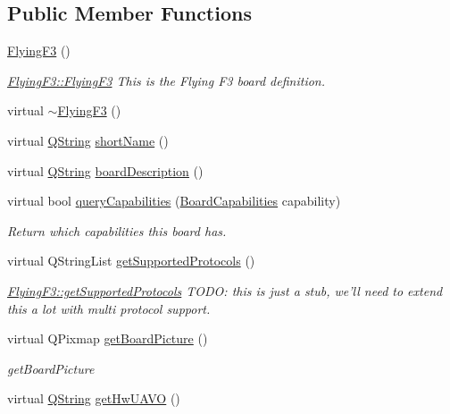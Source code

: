 \subsection*{Public Member Functions}
\begin{DoxyCompactItemize}
\item 
\hyperlink{group___boards___stm_ga9b44241cce2e1f0737c9fef2eace273b}{Flying\-F3} ()
\begin{DoxyCompactList}\small\item\em \hyperlink{group___boards___stm_ga9b44241cce2e1f0737c9fef2eace273b}{Flying\-F3\-::\-Flying\-F3} This is the Flying F3 board definition. \end{DoxyCompactList}\item 
virtual \hyperlink{group___boards___stm_ga23437724f5332cc76950a41249c6d968}{$\sim$\-Flying\-F3} ()
\item 
virtual \hyperlink{group___u_a_v_objects_plugin_gab9d252f49c333c94a72f97ce3105a32d}{Q\-String} \hyperlink{group___boards___stm_ga968d0cdefdfe42c8f2dfbc4cafca72f2}{short\-Name} ()
\item 
virtual \hyperlink{group___u_a_v_objects_plugin_gab9d252f49c333c94a72f97ce3105a32d}{Q\-String} \hyperlink{group___boards___stm_ga76b7c5c83fb46e122a100ae0ef5fae8f}{board\-Description} ()
\item 
virtual bool \hyperlink{group___boards___stm_ga92cb3b23d790b1b3aadab14c830412f3}{query\-Capabilities} (\hyperlink{group___core_plugin_ga01b09218f2a13aaeee6db007ac6bd967}{Board\-Capabilities} capability)
\begin{DoxyCompactList}\small\item\em Return which capabilities this board has. \end{DoxyCompactList}\item 
virtual Q\-String\-List \hyperlink{group___boards___stm_ga96db192be19ed6a7af49c8668cf4ff36}{get\-Supported\-Protocols} ()
\begin{DoxyCompactList}\small\item\em \hyperlink{group___boards___stm_ga96db192be19ed6a7af49c8668cf4ff36}{Flying\-F3\-::get\-Supported\-Protocols} T\-O\-D\-O\-: this is just a stub, we'll need to extend this a lot with multi protocol support. \end{DoxyCompactList}\item 
virtual Q\-Pixmap \hyperlink{group___boards___stm_ga7639046444dbf061bc2c2402d8ebc05e}{get\-Board\-Picture} ()
\begin{DoxyCompactList}\small\item\em get\-Board\-Picture \end{DoxyCompactList}\item 
virtual \hyperlink{group___u_a_v_objects_plugin_gab9d252f49c333c94a72f97ce3105a32d}{Q\-String} \hyperlink{group___boards___stm_gaa65745b439471a9a0c381fef5f5991c3}{get\-Hw\-U\-A\-V\-O} ()
\end{DoxyCompactItemize}
